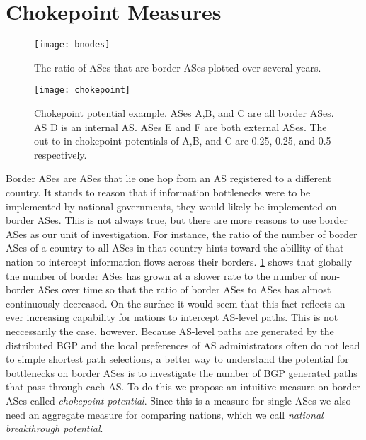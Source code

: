 \section{Chokepoint Measures}


\begin{figure}
	\centering
	\texttt{[image: bnodes]}
	\caption{The ratio of ASes that are border ASes plotted over several years.}\label{fig:bnodes}
\end{figure}

\begin{figure}
	\centering
	\texttt{[image: chokepoint]}
	\caption{Chokepoint potential example. ASes A,B, and C are all border ASes. 
						AS D is an internal AS. ASes E and F are both external ASes.
						The out-to-in chokepoint potentials of A,B, and C are 0.25, 0.25, and 0.5 respectively.}\label{fig:chokepoint}
\end{figure}


Border ASes are ASes that lie one hop from an AS registered to a different country. It stands to reason that if information bottlenecks
were to be implemented by national governments, they would likely be implemented on border ASes. This is not always true, but there are more reasons
to use border ASes as our unit of investigation. For instance, the ratio of the number of border ASes of
a country to all ASes in that country hints toward the abillity of that nation to intercept information flows across their borders.
\figurename \ref{fig:bnodes} shows that globally the number of border ASes has grown at a slower rate to the number of non-border ASes
over time so that the ratio of border ASes to ASes has almost continuously decreased. On the surface it would seem that this fact reflects an ever increasing capability for nations to intercept AS-level paths. This is not
neccessarily the case, however. Because AS-level paths are generated by the distributed BGP and the local preferences of AS administrators often do not
lead to simple shortest path selections, a better way to understand the potential for bottlenecks on border ASes is to investigate the number of BGP generated
paths that pass through each AS. To do this we propose an intuitive measure on border ASes called \emph{chokepoint potential}. Since this is a measure for single ASes
we also need an aggregate measure for comparing nations, which we call \emph{national breakthrough potential}.

